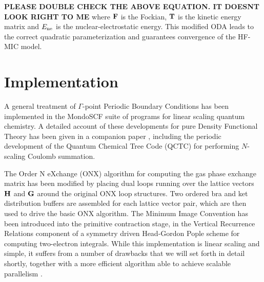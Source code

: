 \documentclass[prb,aps,nobibnotes,twocolumn,doublespace,twocolumngrid,superbib]{revtex4}
\begin{document}
{ \bf PLEASE DOUBLE CHECK THE ABOVE EQUATION.  IT DOESNT LOOK RIGHT TO ME }
where  ${\bf F}$ is the Fockian, $\bf T$ is the kinetic energy matrix  and $E_{\rm ne}$ is the nuclear-electrostatic energy.
This  modified ODA leads to the correct quadratic parameterization and guarantees convergence of the HF-MIC model.  


\section{Implementation}\label{implementation}

A general treatment of $\Gamma$-point Periodic Boundary Conditions has been implemented in the MondoSCF
suite of programs for linear scaling quantum chemistry.  A detailed account of these developments for 
pure Density Functional Theory has been given in a companion paper \cite{CTymczak04A}, including the periodic 
development of the Quantum Chemical Tree Code ({\sc QCTC}) for performing $N$-scaling Coulomb summation.  

The Order N eXchange ({\sc ONX}) algorithm \cite{ESchwegler97} for computing the gas phase exchange matrix 
has been modified by placing dual loops running over the lattice vectors 
${\bf H}$ and ${\bf G}$ around the original ONX loop structures.  Two ordered bra and ket distribution 
buffers are assembled for each lattice vector pair, which are then used to drive the basic {\sc ONX} algorithm.
The Minimum Image Convention has been introduced into the primitive contraction stage, in the 
Vertical Recurrence Relations component of a symmetry driven Head-Gordon Pople \cite{MHeadgordon88} scheme for 
computing two-electron integrals.  While this implementation is linear scaling and simple, it suffers 
from a number of drawbacks that we will set forth in detail shortly, together with a more efficient 
algorithm able to achieve scalable parallelism \cite{}.

\end{document}
